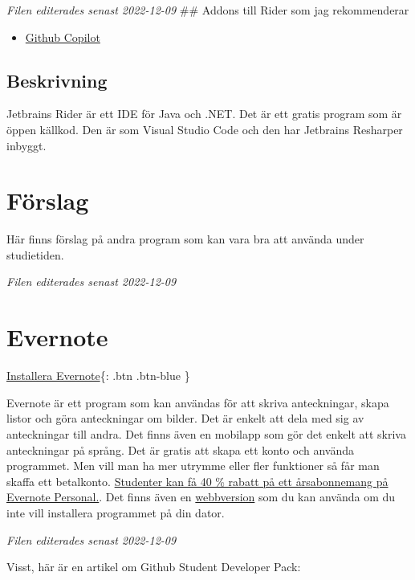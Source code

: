 \emph{Filen editerades senast 2022-12-09} \#\# Addons till Rider som jag
rekommenderar

\begin{itemize}
\tightlist
\item
  \href{https://plugins.jetbrains.com/plugin/17718-github-copilot}{Github
  Copilot}
\end{itemize}

\hypertarget{beskrivning}{%
\subsection{Beskrivning}\label{beskrivning}}

Jetbrains Rider är ett IDE för Java och .NET. Det är ett gratis program
som är öppen källkod. Den är som Visual Studio Code och den har
Jetbrains Resharper inbyggt.

\hypertarget{fuxf6rslag}{%
\section{Förslag}\label{fuxf6rslag}}

Här finns förslag på andra program som kan vara bra att använda under
studietiden.

\emph{Filen editerades senast 2022-12-09}

\hypertarget{evernote}{%
\section{Evernote}\label{evernote}}

\href{https://evernote.com/intl/sv/download/}{Installera Evernote}\{:
.btn .btn-blue \}

Evernote är ett program som kan användas för att skriva anteckningar,
skapa listor och göra anteckningar om bilder. Det är enkelt att dela med
sig av anteckningar till andra. Det finns även en mobilapp som gör det
enkelt att skriva anteckningar på språng. Det är gratis att skapa ett
konto och använda programmet. Men vill man ha mer utrymme eller fler
funktioner så får man skaffa ett betalkonto.
\href{https://evernote.com/intl/sv/students}{Studenter kan få 40 \%
rabatt på ett årsabonnemang på Evernote Personal.}. Det finns även en
\href{https://www.evernote.com/Login.action?targetUrl=\%2Fclient\%2Fweb}{webbversion}
som du kan använda om du inte vill installera programmet på din dator.

\emph{Filen editerades senast 2022-12-09}

Visst, här är en artikel om Github Student Developer Pack:

